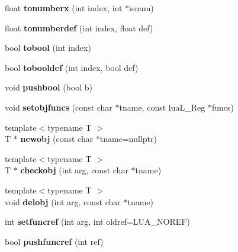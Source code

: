 \begin{DoxyCompactItemize}
\mbox{\label{classlua_1_1State_ae096ee580681ff0db132d6223dcd04b9}} 
float {\bfseries tonumberx} (int index, int $\ast$isnum)
\item 
\mbox{\label{classlua_1_1State_a4feec3d35795db8c9ece553d950020b4}} 
float {\bfseries tonumberdef} (int index, float def)
\item 
\mbox{\label{classlua_1_1State_a5fbde8810d5ccf1a83c61e033f348dc3}} 
bool {\bfseries tobool} (int index)
\item 
\mbox{\label{classlua_1_1State_aebe01d51876d575cb6a5d0c2e1d0b839}} 
bool {\bfseries tobooldef} (int index, bool def)
\item 
\mbox{\label{classlua_1_1State_af24947ed63f848146901fa445397f7bf}} 
void {\bfseries pushbool} (bool b)
\item 
\mbox{\label{classlua_1_1State_aad191bd1628fa2de924441cc07d1642f}} 
void {\bfseries setobjfuncs} (const char $\ast$tname, const lua\+L\+\_\+\+Reg $\ast$funcs)
\item 
\mbox{\label{classlua_1_1State_a0ee389d97e492b1d6e3310f275df55eb}} 
{\footnotesize template$<$typename T $>$ }\\T $\ast$ {\bfseries newobj} (const char $\ast$tname=nullptr)
\item 
\mbox{\label{classlua_1_1State_a96c4f8852c01c5f15ebf0f0dd2b6b377}} 
{\footnotesize template$<$typename T $>$ }\\T $\ast$ {\bfseries checkobj} (int arg, const char $\ast$tname)
\item 
\mbox{\label{classlua_1_1State_a2cc0bbaab97752b91b7f63df4334553c}} 
{\footnotesize template$<$typename T $>$ }\\void {\bfseries delobj} (int arg, const char $\ast$tname)
\item 
\mbox{\label{classlua_1_1State_a8e514745be5fd79a056f8adc9e05a192}} 
int {\bfseries setfuncref} (int arg, int oldref=L\+U\+A\+\_\+\+N\+O\+R\+EF)
\item 
\mbox{\label{classlua_1_1State_a7bef5c0ebe2f37d77b459fd34b5fea63}} 
bool {\bfseries pushfuncref} (int ref)
\end{DoxyCompactItemize}
